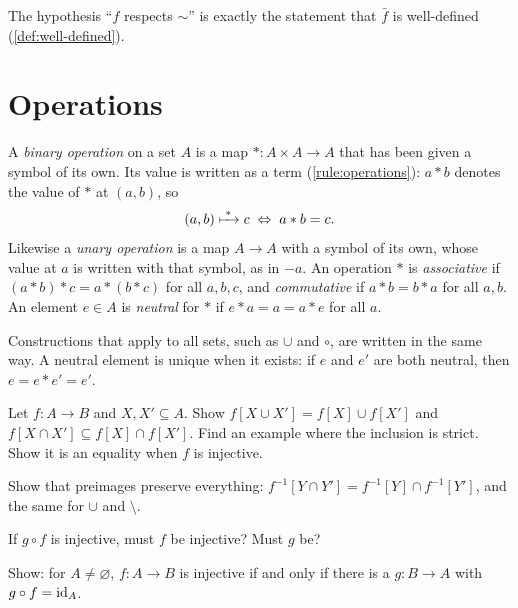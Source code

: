 The hypothesis \enquote{$f$ respects $\sim$} is exactly the statement that $\bar
f$ is well-defined (\cref{def:well-defined}).

\section{Operations}

\begin{definition}[Operation]
\label{def:operation}
A \emph{binary operation} on a set $A$ is a map $\ast \colon A \times A \to A$
that has been given a symbol of its own. Its value is written as a term
(\cref{rule:operations}): $a \ast b$ denotes the value of $\ast$ at $(a, b)$, so
\[
  (a, b) \xmapsto{\;\ast\;} c \;\Leftrightarrow\; a \ast b = c.
\]
Likewise a \emph{unary operation} is a map $A \to A$ with a symbol of its own,
whose value at $a$ is written with that symbol, as in $-a$. An operation $\ast$ is
\emph{associative} if $(a \ast b) \ast c = a \ast (b \ast c)$ for all $a, b, c$,
and \emph{commutative} if $a \ast b = b \ast a$ for all $a, b$. An element $e \in
A$ is \emph{neutral} for $\ast$ if $e \ast a = a = a \ast e$ for all $a$.
\end{definition}

Constructions that apply to all sets, such as $\cup$ and $\circ$, are written in the
same way. A neutral element is unique when it exists: if $e$ and $e'$ are both
neutral, then $e = e \ast e' = e'$.

\begin{exercises}
  \item Let $f \colon A \to B$ and $X, X' \subseteq A$. Show $f[X \cup X'] = f[X]
    \cup f[X']$ and $f[X \cap X'] \subseteq f[X] \cap f[X']$. Find an example where
    the inclusion is strict. Show it is an equality when $f$ is injective.
  \item Show that preimages preserve everything: $f^{-1}[Y \cap Y'] = f^{-1}[Y]
    \cap f^{-1}[Y']$, and the same for $\cup$ and $\setminus$.
  \item If $g \circ f$ is injective, must $f$ be injective? Must $g$ be?
  \item Show: for $A \neq \varnothing$, $f \colon A \to B$ is injective if and only
    if there is a $g \colon B \to A$ with $g \circ f = \mathrm{id}_A$.
\end{exercises}
